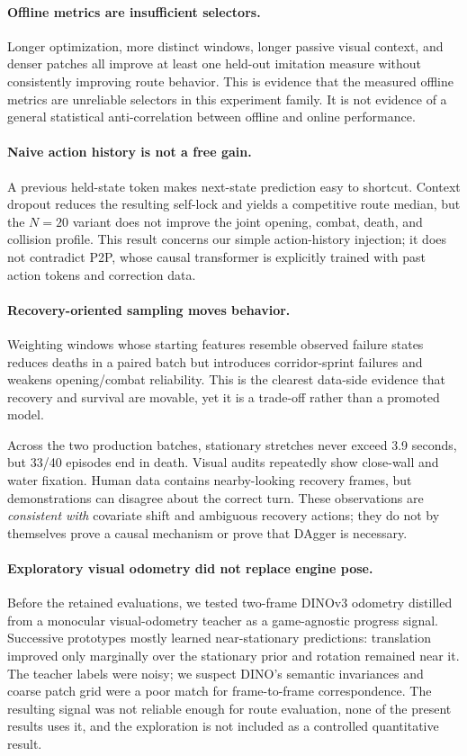 \documentclass[11pt]{article}
\begin{document}
\paragraph{Offline metrics are insufficient selectors.} Longer optimization, more distinct windows, longer passive visual context, and denser patches all improve at least one held-out imitation measure without consistently improving route behavior. This is evidence that the measured offline metrics are unreliable selectors in this experiment family. It is not evidence of a general statistical anti-correlation between offline and online performance.

\paragraph{Naive action history is not a free gain.} A previous held-state token makes next-state prediction easy to shortcut. Context dropout reduces the resulting self-lock and yields a competitive route median, but the $N{=}20$ variant does not improve the joint opening, combat, death, and collision profile. This result concerns our simple action-history injection; it does not contradict P2P, whose causal transformer is explicitly trained with past action tokens and correction data.

\paragraph{Recovery-oriented sampling moves behavior.} Weighting windows whose starting features resemble observed failure states reduces deaths in a paired batch but introduces corridor-sprint failures and weakens opening/combat reliability. This is the clearest data-side evidence that recovery and survival are movable, yet it is a trade-off rather than a promoted model.

Across the two production batches, stationary stretches never exceed 3.9 seconds, but 33/40 episodes end in death. Visual audits repeatedly show close-wall and water fixation. Human data contains nearby-looking recovery frames, but demonstrations can disagree about the correct turn. These observations are \emph{consistent with} covariate shift and ambiguous recovery actions; they do not by themselves prove a causal mechanism or prove that DAgger is necessary.

\paragraph{Exploratory visual odometry did not replace engine pose.} Before the retained evaluations, we tested two-frame DINOv3 odometry distilled from a monocular visual-odometry teacher as a game-agnostic progress signal. Successive prototypes mostly learned near-stationary predictions: translation improved only marginally over the stationary prior and rotation remained near it. The teacher labels were noisy; we suspect DINO's semantic invariances and coarse patch grid were a poor match for frame-to-frame correspondence. The resulting signal was not reliable enough for route evaluation, none of the present results uses it, and the exploration is not included as a controlled quantitative result.
\end{document}
